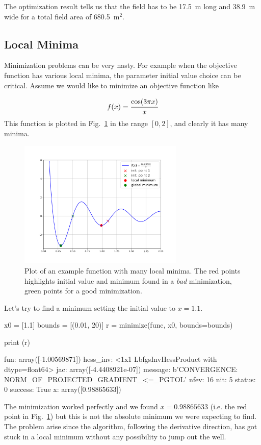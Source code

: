 The optimization result tells us that the field has to be 17.5~m long and 38.9~m wide for a total field area of 680.5~$\textrm{m}^2$.

\subsection{Local Minima}
Minimization problems can be very nasty. For example when the objective function has various local minima, the parameter initial value choice can be critical. 
Assume we would like to minimize an objective function like 

\begin{equation*}
f(x) = \cfrac{\mathrm{cos}(3\pi x)}{x}
\end{equation*}
This function is plotted in Fig.~\ref{fig:local_minima} in the range $[0, 2]$, and clearly it has many minima. 

\begin{figure}[htb]
	\centering
	\includegraphics[width=0.7\textwidth]{figures/local_minima}
	\caption{Plot of an example function with many local minima. The red points highlights initial value and minimum found in a \emph{bad} minimization, green points for a good minimization.}
	\label{fig:local_minima}
\end{figure}
Let's try to find a minimum setting the initial value to $x=1.1$.
\begin{ipythonnon}
x0 = [1.1]
bounds = [(0.01, 20)]
r = minimize(func, x0, bounds=bounds)

print (r)
\end{ipythonnon}
\begin{ioutput}
     fun: array([-1.00569871])
hess_inv: <1x1 LbfgsInvHessProduct with dtype=float64>
     jac: array([-4.4408921e-07])
 message: b'CONVERGENCE: NORM_OF_PROJECTED_GRADIENT_<=_PGTOL'
    nfev: 16
     nit: 5
  status: 0
 success: True
       x: array([0.98865633])
\end{ioutput}
The minimization worked perfectly and we found $x=0.98865633$ (i.e. the red point in Fig.~\ref{fig:local_minima}) but this is not the absolute minimum we 
were expecting to find. The problem arise since the algorithm, following the derivative direction, has got stuck in a local minimum without any possibility 
to jump out the well.

